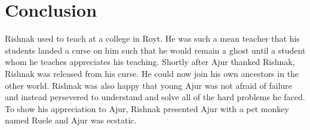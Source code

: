 \chapter{Conclusion}
Rishnak used to teach at a college in Royt. He was such a mean teacher that his students landed a curse on him such that he would remain a ghost until a student whom he teaches appreciates his teaching. Shortly after Ajur thanked Rishnak, Rishnak was released from his curse.  He could now join his own ancestors in the other world. Rishnak was also happy that young Ajur was not afraid of failure and instead persevered to understand and solve all of the hard problems he faced. To show his appreciation to Ajur, Rishnak presented Ajur with a pet monkey named Ruele and Ajur was ecstatic.
